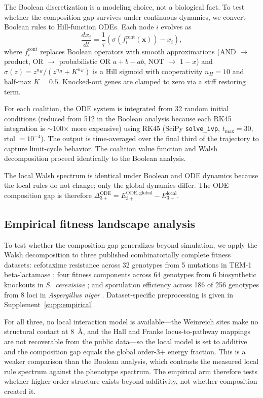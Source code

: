 \documentclass[10pt]{article}
\begin{document}
The Boolean discretization is a modeling choice, not a biological
fact. To test whether the composition gap survives under continuous
dynamics, we convert Boolean rules to Hill-function ODEs. Each node
$i$ evolves as
\begin{equation}
  \frac{dx_i}{dt} = \frac{1}{\tau}
  \left( \sigma\!\left(f_i^{\mathrm{cont}}(\mathbf{x})\right) - x_i \right),
\end{equation}
where $f_i^{\mathrm{cont}}$ replaces Boolean operators with smooth
approximations (AND $\to$ product, OR $\to$ probabilistic OR
$a + b - ab$, NOT $\to$ $1 - x$) and $\sigma(z) = z^{n_H} / (z^{n_H} + K^{n_H})$
is a Hill sigmoid with cooperativity $n_H = 10$ and half-max $K = 0.5$.
Knocked-out genes are clamped to zero via a stiff restoring term.

For each coalition, the ODE system is integrated from 32 random
initial conditions (reduced from 512 in the Boolean analysis because
each RK45 integration is $\sim$100$\times$ more expensive) using RK45 (SciPy \texttt{solve\_ivp},
$t_{\max} = 30$, rtol $= 10^{-4}$). The output is time-averaged
over the final third of the trajectory to capture limit-cycle
behavior. The coalition value function and Walsh decomposition
proceed identically to the Boolean analysis.

The local Walsh spectrum is identical under Boolean and ODE dynamics
because the local rules do not change; only the global dynamics
differ. The ODE composition gap is therefore
$\Delta_{3+}^{\mathrm{ODE}} = E_{3+}^{\mathrm{ODE,global}} - E_{3+}^{\mathrm{local}}$.


\subsection{Empirical fitness landscape analysis}
\label{sec:empirical-method}

To test whether the composition gap generalizes beyond simulation, we
apply the Walsh decomposition to three published combinatorially
complete fitness datasets: cefotaxime resistance across 32 genotypes
from 5 mutations in TEM-1 beta-lactamase
\citep{weinreich2006darwinian}; four fitness components across 64
genotypes from 6 biosynthetic knockouts in \emph{S.~cerevisiae}
\citep{hall2010fitness}; and sporulation efficiency across 186 of 256
genotypes from 8 loci in \emph{Aspergillus niger}
\citep{franke2011evolutionary}. Dataset-specific preprocessing is given
in Supplement~\ref{supp:empirical}.

For all three, no local interaction model is available---the Weinreich
sites make no structural contact at 8~\AA, and the Hall and Franke
locus-to-pathway mappings are not recoverable from the public
data---so the local model is set to additive and the composition gap
equals the global order-3+ energy fraction. This is a weaker comparison
than the Boolean analysis, which contrasts the measured local rule
spectrum against the phenotype spectrum. The empirical arm therefore
tests whether higher-order structure exists beyond additivity, not
whether composition created it.
\end{document}
